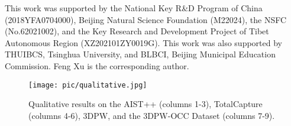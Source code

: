 \documentclass[sigconf,nonacm=true]{acmart}
\begin{document}
\begin{acks}
This work was supported by the National Key R\&D Program of China (2018YFA0704000), Beijing Natural Science Foundation (M22024), the NSFC (No.62021002), and the Key Research and Development Project of Tibet Autonomous Region (XZ202101ZY0019G).
This work was also supported by THUIBCS, Tsinghua University, and BLBCI, Beijing Municipal Education Commission.
Feng Xu is the corresponding author.
\end{acks}



\begin{figure*}
\texttt{[image: pic/qualitative.jpg]}
  \centering
  \caption{
   Qualitative results on the AIST++ (columns 1-3), TotalCapture (columns 4-6), 3DPW, and the 3DPW-OCC Dataset (columns 7-9).}
\label{fig:comparison}
\end{figure*}
\end{document}
